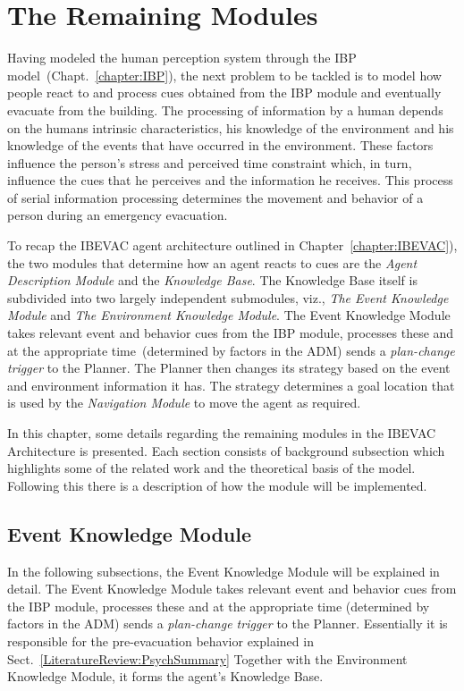 \chapter{The Remaining Modules}
\label{chapter:TheRemainingModules}

Having modeled the human perception system through the IBP model~(Chapt.~\ref{chapter:IBP}), the next problem to be tackled is to model how people react to and process cues obtained from the IBP module and eventually evacuate from the building. The processing of information by a human depends on the humans intrinsic characteristics, his knowledge of the environment and his knowledge of the events that have occurred in the environment. These factors influence the person's stress and perceived time constraint which, in turn, influence the cues that he perceives and the information he receives. This process of serial information processing determines the movement and behavior of a person during an emergency evacuation.

To recap the IBEVAC agent architecture outlined in Chapter~\ref{chapter:IBEVAC}), the two modules that determine how an agent reacts to cues are the \emph{Agent Description Module} and the \emph{Knowledge Base}. The Knowledge Base itself is subdivided into two largely independent submodules, viz., \emph{The Event Knowledge Module} and \emph{The Environment Knowledge Module}. The Event Knowledge Module takes relevant event and behavior cues from the IBP module, processes these and at the appropriate time~(determined by factors in the ADM) sends a \emph{plan-change trigger} to the Planner. The Planner then changes its strategy based on the event and environment information it has. The strategy determines a goal location that is used by the \emph{Navigation Module} to move the agent as required.

In this chapter, some details regarding the remaining modules in the IBEVAC Architecture is presented. Each section consists of background subsection which highlights some of the related work and the theoretical basis of the model. Following this there is a description of how the module will be implemented.

\section{Event Knowledge Module}
\label{CFW:EventIdentification}

In the following subsections, the Event Knowledge Module will be explained in detail. The Event Knowledge Module takes relevant event and behavior cues from the IBP module, processes these and at the appropriate time (determined by factors in the ADM) sends a \emph{plan-change trigger} to the Planner. Essentially it is responsible for the pre-evacuation behavior explained in Sect.~\ref{LiteratureReview:PsychSummary} Together with the Environment Knowledge Module, it forms the agent's Knowledge Base.


